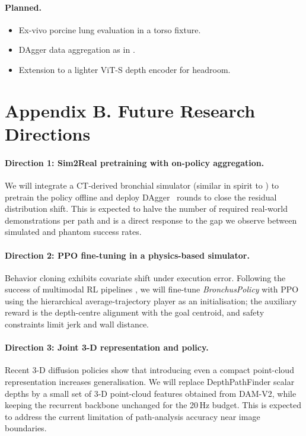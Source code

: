 \documentclass[journal,comsoc]{IEEEtran}
\begin{document}
\paragraph{Planned.}
\begin{itemize}[leftmargin=*,topsep=1pt,itemsep=0pt]
\item Ex-vivo porcine lung evaluation in a torso fixture.
\item DAgger data aggregation as in \cite{zhang2024aicopilot}.
\item Extension to a lighter ViT-S depth encoder for headroom.
\end{itemize}

\section*{Appendix B. Future Research Directions}
\label{sec:future}

\paragraph{Direction 1: Sim2Real pretraining with on-policy
aggregation.}
We will integrate a CT-derived bronchial simulator (similar in spirit
to \cite{zhang2024aicopilot}) to pretrain the policy offline and
deploy DAgger~\cite{ross2011dagger} rounds to close the residual
distribution shift. This is expected to halve the number of required
real-world demonstrations per path and is a direct response to the
gap we observe between simulated and phantom success rates.

\paragraph{Direction 2: PPO fine-tuning in a physics-based
simulator.}
Behavior cloning exhibits covariate shift under execution error.
Following the success of multimodal RL pipelines
\cite{pore2024bronchocopilot}, we will fine-tune \textit{BronchusPolicy}
with PPO using the hierarchical average-trajectory player as an
initialisation; the auxiliary reward is the depth-centre alignment
with the goal centroid, and safety constraints limit jerk and wall
distance.

\paragraph{Direction 3: Joint 3-D representation and policy.}
Recent 3-D diffusion policies \cite{ze2024dp3} show that introducing
even a compact point-cloud representation increases
generalisation. We will replace DepthPathFinder scalar depths by a
small set of 3-D point-cloud features obtained from DAM-V2, while
keeping the recurrent backbone unchanged for the 20\,Hz budget. This
is expected to address the current limitation of path-analysis
accuracy near image boundaries.
\end{document}
